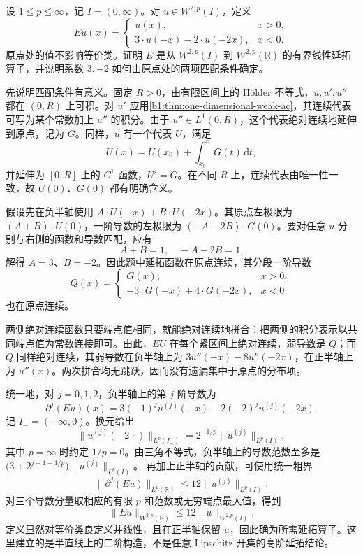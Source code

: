 \begin{optionalexercise}\label{b1:ex:22-second-order-reflection}
设 \(1\le p\le\infty\)，记 \(I=(0,\infty)\)。对 \(u\in W^{2,p}(I)\)，定义
\[
 Eu(x)=
 \begin{cases}
 u(x),&x>0,\\
 3\cdot u(-x)-2\cdot u(-2x),&x<0.
 \end{cases}
\]
原点处的值不影响等价类。证明 \(E\) 是从 \(W^{2,p}(I)\) 到 \(W^{2,p}(\mathbb R)\) 的有界线性延拓算子，并说明系数 \(3,-2\) 如何由原点处的两项匹配条件确定。
\end{optionalexercise}
\begin{solution}
先说明匹配条件有意义。固定 \(R>0\)，由有限区间上的 Hölder 不等式，\(u,u',u''\) 都在 \((0,R)\) 上可积。对 \(u'\) 应用\cref{b1:thm:one-dimensional-weak-ac}，其连续代表可写为某个常数加上 \(u''\) 的积分。由于 \(u''\in L^1(0,R)\)，这个代表绝对连续地延伸到原点，记为 \(G\)。同样，\(u\) 有一个代表 \(U\)，满足
\[
 U(x)=U(x_0)+\int_{x_0}^xG(t)\,\mathrm dt,
\]
并延伸为 \([0,R]\) 上的 \(C^1\) 函数，\(U'=G\)。在不同 \(R\) 上，连续代表由唯一性一致，故 \(U(0)\)、\(G(0)\) 都有明确含义。

假设先在负半轴使用 \(A\cdot U(-x)+B\cdot U(-2x)\)。其原点左极限为 \((A+B)\cdot U(0)\)，一阶导数的左极限为 \((-A-2B)\cdot G(0)\)。要对任意 \(u\) 分别与右侧的函数和导数匹配，应有
\[
 A+B=1,\quad -A-2B=1.
\]
解得 \(A=3\)、\(B=-2\)。因此题中延拓函数在原点连续，其分段一阶导数
\[
 Q(x)=
 \begin{cases}
 G(x),&x>0,\\
 -3\cdot G(-x)+4\cdot G(-2x),&x<0
 \end{cases}
\]
也在原点连续。

两侧绝对连续函数只要端点值相同，就能绝对连续地拼合：把两侧的积分表示以共同端点值为常数连接即可。由此，\(EU\) 在每个紧区间上绝对连续，弱导数是 \(Q\)；而 \(Q\) 同样绝对连续，其弱导数在负半轴上为 \(3u''(-x)-8u''(-2x)\)，在正半轴上为 \(u''(x)\)。两次拼合均无跳跃，因而没有遗漏集中于原点的分布项。

统一地，对 \(j=0,1,2\)，负半轴上的第 \(j\) 阶导数为
\[
 \partial^j(Eu)(x)
 =3(-1)^ju^{(j)}(-x)-2(-2)^ju^{(j)}(-2x).
\]
记 \(I_-=(-\infty,0)\)。换元给出
\[
 \|u^{(j)}(-2\,\cdot)\|_{L^p(I_-)}
 =2^{-1/p}\|u^{(j)}\|_{L^p(I)},
\]
其中 \(p=\infty\) 时约定 \(1/p=0\)。由三角不等式，负半轴上的导数范数至多是
\(\bigl(3+2^{j+1-1/p}\bigr)\|u^{(j)}\|_{L^p(I)}\)。
再加上正半轴的贡献，可使用统一粗界
\[
 \|\partial^j(Eu)\|_{L^p(\mathbb R)}
 \le12\|u^{(j)}\|_{L^p(I)}.
\]
对三个导数分量取相应的有限 \(p\) 和范数或无穷端点最大值，得到
\[
 \|Eu\|_{W^{2,p}(\mathbb R)}
 \le12\|u\|_{W^{2,p}(I)}.
\]
定义显然对等价类良定义并线性，且在正半轴保留 \(u\)，因此确为所需延拓算子。这里建立的是半直线上的二阶构造，不是任意 Lipschitz 开集的高阶延拓结论。
\end{solution}

